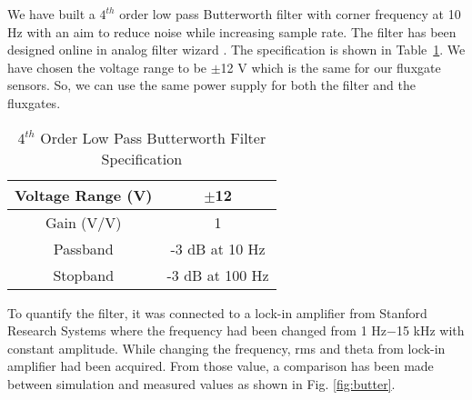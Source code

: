 We have built a $4^{th}$ order low pass Butterworth filter with corner frequency at 10 Hz with an aim to reduce noise while increasing sample rate. The filter has been designed online in analog filter wizard \cite{fWizard}. The specification is shown in Table~\ref{table:butter}. We have chosen the voltage range to be $\pm$12 V which is the same for our fluxgate sensors. So, we can use the same power supply for both the filter and the fluxgates.


\begin{table} [!htb]
    \centering
    \begin{tabular} { |c|c| } 
        \hline
        Voltage Range (V) & $\pm$12\\ 
        \hline
        Gain (V/V) & 1 \\ 
        \hline
        Passband & -3 dB at 10 Hz\\ 
        \hline
        Stopband & -3 dB at 100 Hz\\
         \hline
    \end{tabular}
    \caption{$4^{th}$ Order Low Pass Butterworth Filter Specification}\label{table:butter}
\end{table}

To quantify the filter, it was connected to a lock-in amplifier from Stanford Research Systems where the frequency had been changed from 1 Hz$-$15 kHz with constant amplitude. While changing the frequency, rms and theta from lock-in amplifier had been acquired. From those value, a comparison has been made between simulation and measured values as shown in Fig. \ref{fig:butter}.


